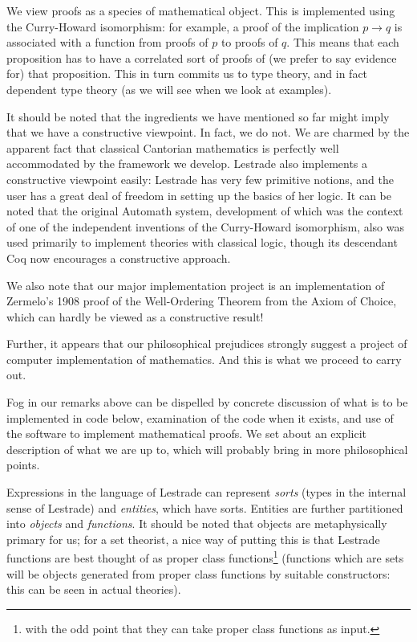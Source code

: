 \documentclass[12pt]{article}
\begin{document}
We view proofs as a species of mathematical object.  This is implemented using the Curry-Howard isomorphism:  for example, a proof of the implication $p \rightarrow q$ is associated with a function from proofs of $p$ to proofs of $q$.  This means that each proposition has to have a correlated sort of proofs of (we prefer to say evidence for) that proposition.  This in turn commits us to type theory, and in fact dependent type theory (as we will see when we look at examples).

It should be noted that the ingredients we have mentioned so far might imply that we have a constructive viewpoint.  In fact, we do not.  We are charmed by the apparent fact that classical
Cantorian mathematics is perfectly well accommodated by the framework we develop.  Lestrade also implements a constructive viewpoint easily:  Lestrade has very few primitive notions, and the user has a great deal of freedom in setting up the basics of her logic.  It can be noted that the original Automath system, development of which was the context of one of the independent inventions of the Curry-Howard isomorphism, also was used primarily to implement theories with classical logic, though its descendant Coq now encourages a constructive approach.

We also note that our major implementation project is an implementation of Zermelo's 1908 proof of the Well-Ordering Theorem from the Axiom of Choice, which can hardly be viewed as a constructive result!

Further, it appears that our philosophical prejudices strongly suggest a project of computer implementation of mathematics.  And this is what we proceed to carry out.

Fog in our remarks above can be dispelled by concrete discussion of what is to be implemented in code below, examination of the code when it exists, and use of the software to implement
mathematical proofs.  We set about an explicit description of what we are up to, which will probably bring in more philosophical points.

Expressions in the language of Lestrade can represent {\em sorts} (types in the internal sense of Lestrade) and {\em entities\/}, which have sorts.  Entities are further partitioned
into {\em objects\/} and {\em functions\/}.  It should be noted that objects are metaphysically primary for us;  for a set theorist, a nice way of putting this is that Lestrade functions
are best thought of as proper class functions\footnote{with the odd point that they can take proper class functions as input.}  (functions which are sets will be objects generated from proper class functions by suitable constructors:  this can be seen in actual theories).
\end{document}

